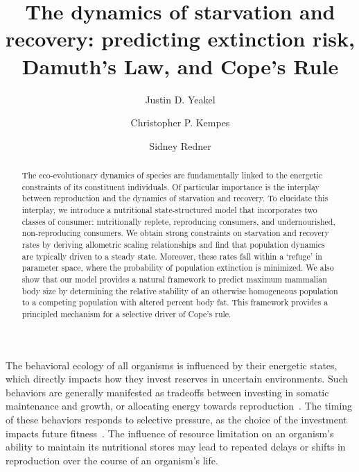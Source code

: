 \documentclass[twocolumn,preprintnumbers,amsmath,amssymb,superscriptaddress]{revtex4}
\begin{document}
\author{Justin D. Yeakel} 

\author{Christopher P. Kempes} 

\author{Sidney Redner} 

\title{The dynamics of starvation and recovery: predicting extinction risk, Damuth's Law, and Cope's Rule}%


\begin{abstract} %
The eco-evolutionary dynamics of species are fundamentally linked to the energetic constraints of its constituent individuals. Of particular importance is the interplay between reproduction and the dynamics of starvation and recovery. To elucidate this interplay, we introduce a nutritional state-structured model that incorporates two classes of consumer: nutritionally replete, reproducing consumers, and undernourished, non-reproducing consumers. We obtain strong constraints on starvation and recovery rates by deriving allometric scaling relationships and find that population dynamics are typically driven to a steady state. Moreover, these rates fall within a `refuge' in parameter space, where the probability of population extinction is minimized. We also show that our model provides a natural framework to predict maximum mammalian body size by determining the relative stability of an otherwise homogeneous population to a competing population with altered percent body fat. This framework provides a principled mechanism for a selective driver of Cope's rule.
\end{abstract}

\maketitle




The behavioral ecology of all organisms is influenced by their energetic
states, which directly impacts how they invest reserves in uncertain
environments.  Such behaviors are generally manifested as tradeoffs between
investing in somatic maintenance and growth, or allocating energy towards
reproduction~\citep{Martin:1987dl,Kirk:1997cc,Kempes:2012hy}.  The timing of
these behaviors responds to selective pressure, as the choice of the
investment impacts future
fitness~\citep{Mangel:1988uaa,Mangel:2014kz,Yeakel:2013hi}.  The influence of
resource limitation on an organism's ability to maintain its nutritional
stores may lead to repeated delays or shifts in reproduction over the course
of an organism's life.
\end{document}
